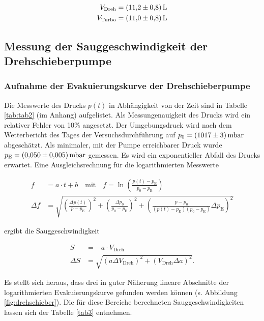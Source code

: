 \begin{align}
	V_\text{Dreh} &= \SI{11.2+-0.8}{\litre}\\
	V_\text{Turbo} &= \SI{11.0+-0.8}{\litre}
\end{align}


\subsection{Messung der Sauggeschwindigkeit der Drehschieberpumpe}

\subsubsection{Aufnahme der Evakuierungskurve der Drehschieberpumpe}

Die Messwerte des Drucks $p(t)$ in Abhängigkeit von der Zeit sind in Tabelle \ref{tab:tab2} (im Anhang) aufgelistet. Als Messungenauigkeit des Drucks wird ein relativer Fehler von 10\% angesetzt. Der Umgebungsdruck wird nach dem Wetterbericht des Tages der Versuchsdurchführung \cite{wetter} auf $p_0 = \SI{1017 +-3}{\milli \bar}$ abgeschätzt. Als minimaler, mit der Pumpe erreichbarer Druck wurde $p_\text{E} = \SI{0.05+-0.005}{\milli \bar}$ gemessen. Es wird ein exponentieller Abfall des Drucks erwartet. Eine Ausgleichsrechnung für die logarithmierten Messwerte

\begin{align}
	f &= a \cdot t + b \quad \text{mit} \quad f = \ln \left(\frac{p(t) -p_\text{E}}{p_0 - p_\text{E}}\right)\\
	\Delta f &= \sqrt{\left(\frac{\Delta p(t)}{p-p_\text{E}}\right)^2 + \left(\frac{\Delta p_0}{p_0 - p_\text{E}}\right)^2 + \left(\frac{p- p_0}{(p(t) - p_\text{E}) (p_0 - p_\text{E})} \Delta p_\text{E}\right)^2}
\end{align}

ergibt die Sauggeschwindigkeit

\begin{align}
	S &= - a \cdot V_\text{Dreh}\\
	\Delta S &= \sqrt{\left(a \Delta V_\text{Dreh}\right)^2 + \left(V_\text{Dreh} \Delta a\right)^2}.
\end{align}

Es stellt sich heraus, dass drei in guter Näherung lineare Abschnitte der logarithmierten Evakuierungskurve gefunden werden können (s. Abbildung \ref{fig:drehschieber}). Die für diese Bereiche berechneten Sauggeschwindigkeiten lassen sich der Tabelle \ref{tab3} entnehmen.

